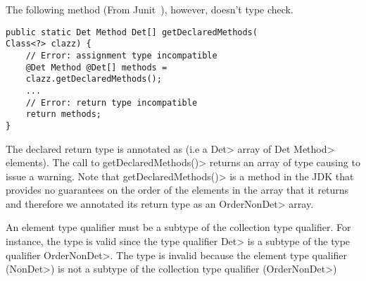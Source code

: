 The following method (From Junit~\cite{junit}), however, doesn't type check.
\begin{Verbatim}
public static Det Method Det[] getDeclaredMethods(
Class<?> clazz) {
    // Error: assignment type incompatible
    @Det Method @Det[] methods = 
    clazz.getDeclaredMethods();
    ...
    // Error: return type incompatible
    return methods;
}
\end{Verbatim}
The declared return type is annotated as  (i.e a \<Det> array of \<Det Method> elements).
The call to \<getDeclaredMethods()> returns an array of type 
causing \theDeterminismChecker to issue a warning.
Note that \<getDeclaredMethods()> is a method in the JDK that provides no guarantees on the order of
the elements in the array that it returns and therefore we annotated its return type
as an \<OrderNonDet> array.

An element type qualifier must be a subtype of the collection type qualifier.
For instance, the type  is valid since the type qualifier
\<Det> is a subtype of the type qualifier \<OrderNonDet>.
The type  is invalid because the element type qualifier (\<NonDet>) is not a subtype of the collection type qualifier (\<OrderNonDet>)


